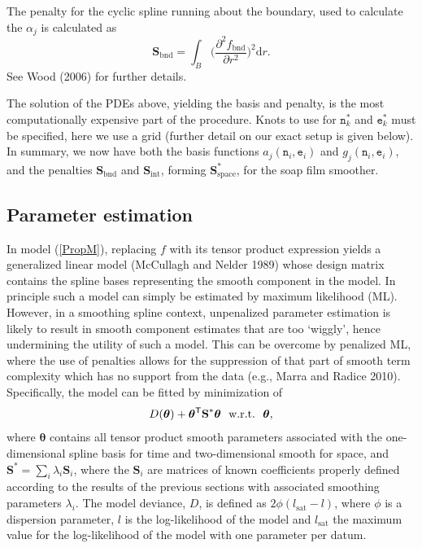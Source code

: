 \documentclass[10pt]{article}
\newcommand{\beq}{\begin{equation}}
\newcommand{\eeq}{\end{equation}}
\newcommand{\ts}{^{\sf T}}
\theoremstyle{definition}
\theoremstyle{plain}
\begin{document}
The penalty for the cyclic spline running about the boundary, used to calculate the $\alpha_j$ is calculated as
\beq
\textbf{S}_\text{bnd} = \int_B \Big(\frac{\partial^2 f_\text{bnd}}{\partial r^2}\Big)^2 \text{d}r.
\eeq
See Wood (2006) for further details.

The solution of the PDEs above, yielding the basis and penalty, is the most computationally expensive part of the procedure. Knots to use for $\texttt{n}_k^*$ and $\texttt{e}_k^*$ must be specified, here we use a grid (further detail on our exact setup is given below). In summary, we now have both the basis functions $a_j(\texttt{n}_i,\texttt{e}_i)$ and $g_j(\texttt{n}_i,\texttt{e}_i)$, and the penalties $\textbf{S}_\text{bnd}$ and $\textbf{S}_\text{int}$, forming $\textbf{S}^*_\text{space}$, for the soap film smoother. 

\subsection{Parameter estimation \label{PE}}

In model (\ref{PropM}), replacing $f$ with its tensor product expression yields a generalized linear model (McCullagh and Nelder 1989) whose design matrix contains the spline bases representing the smooth component in the model. In principle such a model can simply be estimated by maximum likelihood (ML). However, in a smoothing spline context, unpenalized parameter estimation is likely to result in smooth component estimates that are too `wiggly', hence undermining the utility of such a model. This can be overcome by penalized ML, where the use of penalties allows for the suppression of that part of smooth term complexity which has no support from the data (e.g., Marra and Radice 2010). Specifically, the model can be fitted by minimization of
\beq
D(\bm\theta) + \bm\theta\ts\textbf{S}^*\bm\theta \ \  \text{w.r.t.} \ \  \bm\theta,
\label{Dev}
\eeq
where $\bm\theta$ contains all tensor product smooth parameters associated with the one-dimensional spline basis for time and two-dimensional smooth for space, and $\textbf{S}^*=\sum_i \lambda_i \textbf{S}_i$, where the $\textbf{S}_i$ are matrices of known coefficients properly defined according to the results of the previous sections with associated smoothing parameters $\lambda_i$. The model deviance, $D$, is defined as $2\phi(l_{\text{sat}}-l)$, where $\phi$ is a dispersion parameter, $l$ is the log-likelihood of the model and $l_{\text{sat}}$ the maximum value for the log-likelihood of the model with one parameter per datum. 
\end{document}
